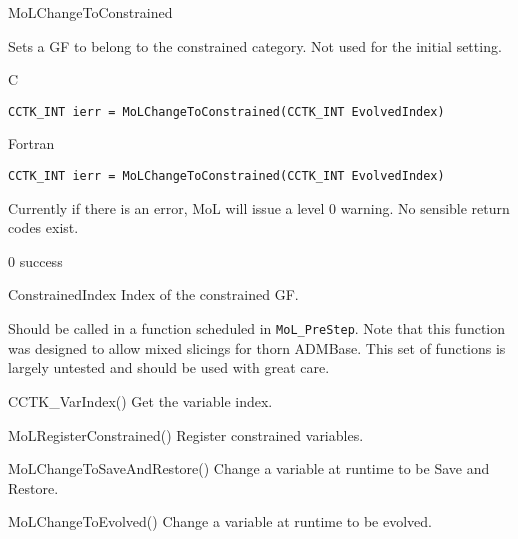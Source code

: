 \begin{FunctionDescription}{MoLChangeToConstrained}
  \label{CactusBase_MoL_MoLChangeToConstrained}
  
  Sets a GF to belong to the constrained category. Not used for the
  initial setting.

  \begin{SynopsisSection}
    \begin{Synopsis}{C}
\begin{verbatim}
CCTK_INT ierr = MoLChangeToConstrained(CCTK_INT EvolvedIndex)
\end{verbatim}
    \end{Synopsis}
    \begin{Synopsis}{Fortran}
\begin{verbatim}
CCTK_INT ierr = MoLChangeToConstrained(CCTK_INT EvolvedIndex)
\end{verbatim}
    \end{Synopsis}
  \end{SynopsisSection}

  \begin{ResultSection}
    \begin{ResultNote}
      Currently if there is an error, MoL will issue a level 0
      warning. No sensible return codes exist.
    \end{ResultNote}
    \begin{Result}{\rm 0}
      success
    \end{Result}
  \end{ResultSection}

  \begin{ParameterSection}
    \begin{Parameter}{ConstrainedIndex}
      Index of the constrained GF.
    \end{Parameter}
  \end{ParameterSection}

  \begin{Discussion}
    Should be called in a function scheduled in {\tt MoL\_PreStep}.
    Note that this function was designed to allow mixed slicings for
    thorn ADMBase. This set of functions is largely untested and
    should be used with great care.
  \end{Discussion}

  \begin{SeeAlsoSection}
    \begin{SeeAlso}{CCTK\_VarIndex()}
      Get the variable index.
    \end{SeeAlso}
    \begin{SeeAlso}{MoLRegisterConstrained()}
      Register constrained variables.
    \end{SeeAlso}
    \begin{SeeAlso}{MoLChangeToSaveAndRestore()}
      Change a variable at runtime to be Save and Restore.
    \end{SeeAlso}
    \begin{SeeAlso}{MoLChangeToEvolved()}
      Change a variable at runtime to be evolved.
    \end{SeeAlso}
  \end{SeeAlsoSection}


\end{FunctionDescription}
